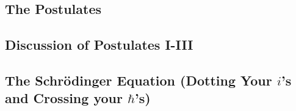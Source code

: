 \subsection{The Postulates}

\subsection{Discussion of Postulates I-III}

\subsection{The Schr\"odinger Equation (Dotting Your $i$'s and Crossing your $\hbar$'s)}
